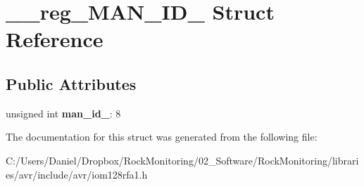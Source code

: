 \hypertarget{struct____reg___m_a_n___i_d__0}{}\section{\+\_\+\+\_\+reg\+\_\+\+M\+A\+N\+\_\+\+I\+D\+\_ Struct Reference}
\label{struct____reg___m_a_n___i_d__0}
\subsection*{Public Attributes}
\begin{DoxyCompactItemize}
\item 
unsigned int {\bfseries man\+\_\+id\+\_}\+: 8\hypertarget{struct____reg___m_a_n___i_d__0_af3937bb45269f1e729868d150d8291ce}{}\label{struct____reg___m_a_n___i_d__0_af3937bb45269f1e729868d150d8291ce}

\end{DoxyCompactItemize}


The documentation for this struct was generated from the following file\+:\begin{DoxyCompactItemize}
\item 
C\+:/\+Users/\+Daniel/\+Dropbox/\+Rock\+Monitoring/02\+\_\+\+Software/\+Rock\+Monitoring/libraries/avr/include/avr/iom128rfa1.\+h\end{DoxyCompactItemize}
